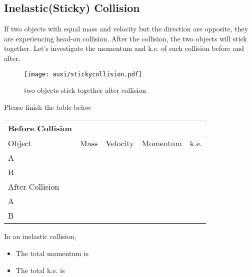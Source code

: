 \documentclass[a4paper]{tufte-handout}
\newenvironment{SummBox}
{\begin{tcolorbox}[breakable,colback=r1!30,colframe=r1,title=Summary]} {\end{tcolorbox}}
\begin{document}
\subsection{Inelastic(Sticky) Collision}
If two objects with equal mass and velocity but the direction are opposite, they are experiencing head-on collision. After the collision, the two objects will stick together. Let's investigate the momentum and k.e. of such collision before and after. 
\begin{figure}
\centering
\texttt{[image: auxi/stickycollision.pdf]}
\caption{two objects stick together after collision}
\end{figure}
Please finish the table below
\begin{table}[h]
\begin{tabular}{lllll}
Before Collision             &                           &                               &                               &                           \\ \hline
\multicolumn{1}{|l|}{Object} & \multicolumn{1}{l|}{Mass} & \multicolumn{1}{l|}{Velocity} & \multicolumn{1}{l|}{Momentum} & \multicolumn{1}{l|}{k.e.} \\ \hline
\multicolumn{1}{|l|}{A}      & \multicolumn{1}{l|}{}     & \multicolumn{1}{l|}{}         & \multicolumn{1}{l|}{}         & \multicolumn{1}{l|}{}     \\ \hline
\multicolumn{1}{|l|}{B}      & \multicolumn{1}{l|}{}     & \multicolumn{1}{l|}{}         & \multicolumn{1}{l|}{}         & \multicolumn{1}{l|}{}     \\ \hline
After Collision              &                           &                               &                               &                           \\ \hline
\multicolumn{1}{|l|}{A}      & \multicolumn{1}{l|}{}     & \multicolumn{1}{l|}{}         & \multicolumn{1}{l|}{}         & \multicolumn{1}{l|}{}     \\ \hline
\multicolumn{1}{|l|}{B}      & \multicolumn{1}{l|}{}     & \multicolumn{1}{l|}{}         & \multicolumn{1}{l|}{}         & \multicolumn{1}{l|}{}     \\ \hline
\end{tabular}
\end{table}

\begin{SummBox}
In an inelastic collision,
\begin{itemize}
  \item The total momentum is \uline{\hspace{2in}}
  \item The total k.e. is  \uline{\hspace{2in}}
\end{itemize}
\end{SummBox}
\end{document}
